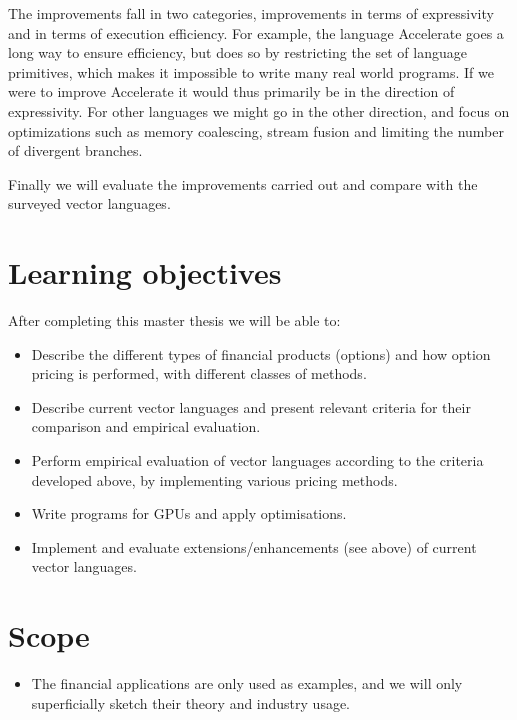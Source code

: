 \documentclass[10pt,a4paper,final,oneside,openany,article]{memoir}
\begin{document}
The improvements fall in two categories, improvements in terms of
expressivity and in terms of execution efficiency. For example, the
language Accelerate goes a long way to ensure efficiency, but does so
by restricting the set of language primitives, which makes it
impossible to write many real world programs. If we were to improve
Accelerate it would thus primarily be in the direction of
expressivity. For other languages we might go in the other direction,
and focus on optimizations such as memory coalescing, stream fusion
and limiting the number of divergent branches.

Finally we will evaluate the improvements carried out and compare with
the surveyed vector languages.

\chapter{Learning objectives}
After completing this master thesis we will be able to:
\begin{itemize}
\item Describe the different types of financial products (options) and
  how option pricing is performed, with different classes of methods.
\item Describe current vector languages and present relevant criteria
  for their comparison and empirical evaluation.
\item Perform empirical evaluation of vector languages according to
  the criteria developed above, by implementing various pricing
  methods.
\item Write programs for GPUs and apply optimisations.
\item Implement and evaluate extensions/enhancements (see above) of
  current vector languages.
\end{itemize}

\chapter{Scope}
\begin{itemize}
\item The financial applications are only used as examples, and we
  will only superficially sketch their theory and industry usage.
\end{itemize}

{} 
\printbibliography

\end{document}

